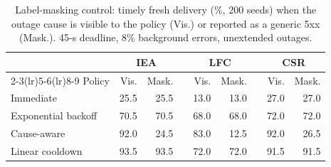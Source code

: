 \begin{table}[t]
\centering
\caption{Label-masking control: timely fresh delivery (\%, 200 seeds) when the outage cause is visible to the policy (Vis.) or reported as a generic 5xx (Mask.). 45-s deadline, 8\% background errors, unextended outages.}
\label{tab:mask}
\scriptsize
\setlength{\tabcolsep}{3.5pt}
\begin{tabular}{@{}lrrcrrcrr@{}}\toprule
 & \multicolumn{2}{c}{IEA} && \multicolumn{2}{c}{LFC} && \multicolumn{2}{c}{CSR}\\
\cmidrule(lr){2-3}\cmidrule(lr){5-6}\cmidrule(lr){8-9}
Policy & Vis. & Mask. && Vis. & Mask. && Vis. & Mask.\\\midrule
Immediate & 25.5 & 25.5 && 13.0 & 13.0 && 27.0 & 27.0\\
Exponential backoff & 70.5 & 70.5 && 68.0 & 68.0 && 72.0 & 72.0\\
Cause-aware & 92.0 & 24.5 && 83.0 & 12.5 && 92.0 & 26.5\\
Linear cooldown & 93.5 & 93.5 && 72.0 & 72.0 && 91.5 & 91.5\\\bottomrule
\end{tabular}
\end{table}

